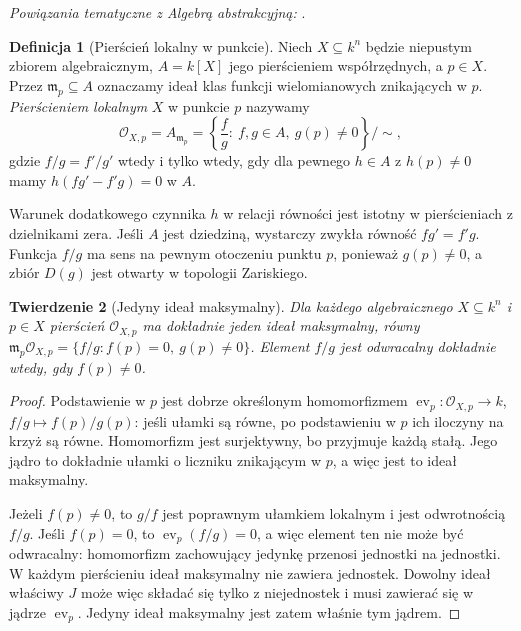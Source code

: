 \documentclass[11pt,a4paper,openany]{report}
\numberwithin{equation}{section}
\theoremstyle{plain}
\newtheorem{twierdzenie}{Twierdzenie}[section]
\theoremstyle{definition}
\newtheorem{definicja}[twierdzenie]{Definicja}
\theoremstyle{remark}
\begin{document}
\noindent\emph{Powiązania tematyczne z Algebrą abstrakcyjną:} .


\begin{definicja}[Pierścień lokalny w punkcie]
\label{def:local-ring-point}
Niech $X\subseteq k^n$ będzie niepustym zbiorem algebraicznym,
$A=k[X]$ jego pierścieniem współrzędnych, a $p\in X$.
Przez $\mathfrak m_p\subseteq A$ oznaczamy ideał klas
funkcji wielomianowych znikających w $p$.
\emph{Pierścieniem lokalnym} $X$ w punkcie $p$ nazywamy
\[
 \mathcal O_{X,p}=A_{\mathfrak m_p}
 =\left\{\frac fg:\ f,g\in A,\ g(p)\ne0\right\}/\!\sim,
\]
gdzie $f/g=f'/g'$ wtedy i tylko wtedy, gdy dla pewnego
$h\in A$ z $h(p)\ne0$ mamy $h(fg'-f'g)=0$ w $A$.
\end{definicja}

Warunek dodatkowego czynnika $h$ w relacji równości jest
istotny w pierścieniach z dzielnikami zera. Jeśli $A$
jest dziedziną, wystarczy zwykła równość $fg'=f'g$.
Funkcja $f/g$ ma sens na pewnym otoczeniu punktu $p$,
ponieważ $g(p)\ne0$, a zbiór $D(g)$ jest otwarty
w topologii Zariskiego.

\begin{twierdzenie}[Jedyny ideał maksymalny]
\label{tw:local-unique-max}
Dla każdego algebraicznego $X\subseteq k^n$ i $p\in X$
pierścień $\mathcal O_{X,p}$ ma dokładnie jeden ideał
maksymalny, równy
$\mathfrak m_p\mathcal O_{X,p}=\{f/g:f(p)=0,\ g(p)\ne0\}$.
Element $f/g$ jest odwracalny dokładnie wtedy, gdy $f(p)\ne0$.
\end{twierdzenie}
\begin{proof}
Podstawienie w $p$ jest dobrze określonym homomorfizmem
$\operatorname{ev}_p:\mathcal O_{X,p}\to k$,
$f/g\mapsto f(p)/g(p)$: jeśli ułamki są równe,
po podstawieniu w $p$ ich iloczyny na krzyż są równe.
Homomorfizm jest surjektywny, bo przyjmuje każdą stałą.
Jego jądro to dokładnie ułamki o liczniku znikającym w $p$,
a więc jest to ideał maksymalny.

Jeżeli $f(p)\ne0$, to $g/f$ jest poprawnym ułamkiem
lokalnym i jest odwrotnością $f/g$. Jeśli $f(p)=0$,
to $\operatorname{ev}_p(f/g)=0$, a więc element ten nie
może być odwracalny: homomorfizm zachowujący jedynkę
przenosi jednostki na jednostki.
W każdym pierścieniu ideał maksymalny nie zawiera jednostek.
Dowolny ideał właściwy $J$ może więc składać się tylko
z niejednostek i musi zawierać się w jądrze
$\operatorname{ev}_p$. Jedyny ideał maksymalny jest zatem
właśnie tym jądrem.
\end{proof}
\end{document}
